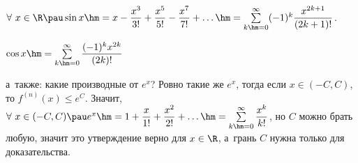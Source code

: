 
    $\forall\  x\in\R\pau \sin x\hm=x-\dfrac{x^3}{3!}+\dfrac{x^5}{5!}-\dfrac{x^7}{7!}+\ldots\hm=\sum\limits_{k\hm=0}^\infty(-1)^k\dfrac{x^{2k+1}}{(2k+1)!}$.

    $\cos x\hm=\sum\limits_{k\hm=0}^\infty\dfrac{(-1)^kx^{2k}}{(2k)!}$

    а~также: какие производные от $e^x$? Ровно такие же $e^x$, тогда если $x\in(-C,C)$, то $f^{(n)}(x)\leq e^C$. Значит,
     $\forall\  x\in(-C,C)\pau e^x\hm=1+\dfrac{x}{1!}+\dfrac{x^2}{2!}+\ldots\hm=\sum\limits_{k\hm=0}^\infty\dfrac{x^k}{k!}$, но $C$ можно брать любую, значит это
    утверждение верно для $x\in\R$, а~грань $C$ нужна только для доказательства.
